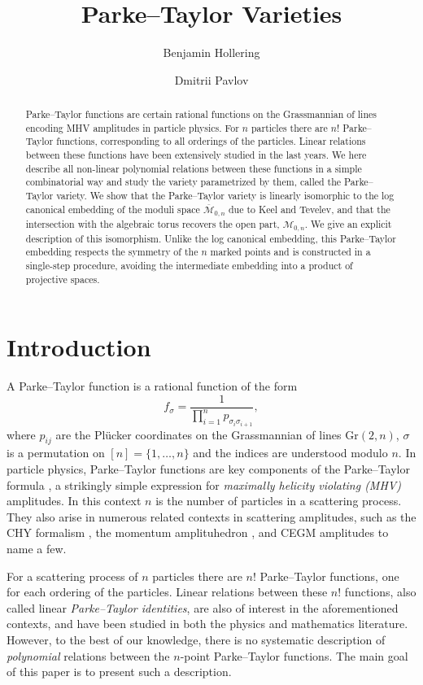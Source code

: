 \documentclass[12pt, reqno]{amsart}
\title{Parke--Taylor Varieties}
\author{Benjamin Hollering}
\author{Dmitrii Pavlov}
\date{}
\numberwithin{equation}{section}
\theoremstyle{plain}
\theoremstyle{definition}
\begin{document}
\begin{abstract}
Parke--Taylor functions are certain rational functions on the Grassmannian of lines encoding MHV amplitudes in particle physics. For $n$ particles there are $n!$ Parke--Taylor functions, corresponding to all orderings of the particles. Linear relations between these functions have been extensively studied in the last years. We here describe all non-linear polynomial relations between these functions in a simple combinatorial way and study the variety parametrized by them, called the Parke--Taylor variety. We show that the Parke--Taylor variety is linearly isomorphic to the log canonical embedding of the moduli space $\overline{\mathcal{M}}_{0,n}$ due to Keel and Tevelev, and that the intersection with the algebraic torus recovers the open part, $\mathcal{M}_{0,n}$. We give an explicit description of this isomorphism. Unlike the log canonical embedding, this Parke--Taylor embedding respects the symmetry of the $n$ marked points and is constructed in a single-step procedure, avoiding the intermediate embedding into a product of projective spaces.
\end{abstract}

\maketitle

\section{Introduction}
A Parke--Taylor function is a rational function of the form 
$$f_\sigma = \dfrac{1}{\prod\limits_{i=1}^n p_{\sigma_i\sigma_{i+1}}},$$
where $p_{ij}$ are the Pl\"ucker coordinates on the Grassmannian of lines $\mathrm{Gr}(2,n)$, $\sigma$ is a permutation on $[n]=\{1,\ldots,n\}$ and the indices are understood modulo $n$. In particle physics, Parke--Taylor functions are key components of the Parke--Taylor formula \cite{parke1986amplitude}, a strikingly simple expression for \emph{maximally helicity violating (MHV)} amplitudes. In this context $n$ is the number of particles in a scattering process. They also arise in numerous related contexts in scattering amplitudes, such as the CHY formalism \cite{cachazo2014scattering}, the momentum amplituhedron \cite{damgaard2021kleiss}, and CEGM amplitudes \cite{cachazo2024color} to name a few. 

For a scattering process of $n$ particles there are $n!$ Parke--Taylor functions, one for each ordering of the particles. Linear relations between these $n!$ functions, also called linear \emph{Parke--Taylor identities}, are also of interest in the aforementioned contexts, and have been studied in both the physics \cite{cachazo2019delta,AH2015nonplanar,frost2021lie,cachazo2024color,damgaard2021kleiss} and mathematics \cite{parisi2024magic} literature. However, to the best of our knowledge, there is no systematic description of \emph{polynomial} relations between the $n$-point Parke--Taylor functions. The main goal of this paper is to present such a description. 
\end{document}
